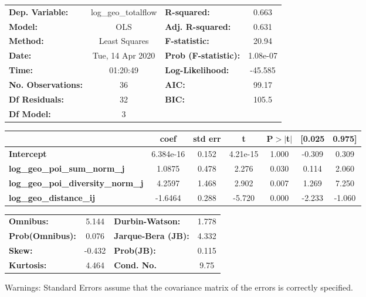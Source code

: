 \begin{center}
\begin{tabular}{lclc}
\toprule
\textbf{Dep. Variable:}                    & log\_geo\_totalflow & \textbf{  R-squared:         } &     0.663   \\
\textbf{Model:}                            &         OLS         & \textbf{  Adj. R-squared:    } &     0.631   \\
\textbf{Method:}                           &    Least Squares    & \textbf{  F-statistic:       } &     20.94   \\
\textbf{Date:}                             &   Tue, 14 Apr 2020  & \textbf{  Prob (F-statistic):} &  1.08e-07   \\
\textbf{Time:}                             &       01:20:49      & \textbf{  Log-Likelihood:    } &   -45.585   \\
\textbf{No. Observations:}                 &            36       & \textbf{  AIC:               } &     99.17   \\
\textbf{Df Residuals:}                     &            32       & \textbf{  BIC:               } &     105.5   \\
\textbf{Df Model:}                         &             3       & \textbf{                     } &             \\
\bottomrule
\end{tabular}
\begin{tabular}{lcccccc}
                                           & \textbf{coef} & \textbf{std err} & \textbf{t} & \textbf{P$> |$t$|$} & \textbf{[0.025} & \textbf{0.975]}  \\
\midrule
\textbf{Intercept}                         &    6.384e-16  &        0.152     &  4.21e-15  &         1.000        &       -0.309    &        0.309     \\
\textbf{log\_geo\_poi\_sum\_norm\_j}       &       1.0875  &        0.478     &     2.276  &         0.030        &        0.114    &        2.060     \\
\textbf{log\_geo\_poi\_diversity\_norm\_j} &       4.2597  &        1.468     &     2.902  &         0.007        &        1.269    &        7.250     \\
\textbf{log\_geo\_distance\_ij}            &      -1.6464  &        0.288     &    -5.720  &         0.000        &       -2.233    &       -1.060     \\
\bottomrule
\end{tabular}
\begin{tabular}{lclc}
\textbf{Omnibus:}       &  5.144 & \textbf{  Durbin-Watson:     } &    1.778  \\
\textbf{Prob(Omnibus):} &  0.076 & \textbf{  Jarque-Bera (JB):  } &    4.332  \\
\textbf{Skew:}          & -0.432 & \textbf{  Prob(JB):          } &    0.115  \\
\textbf{Kurtosis:}      &  4.464 & \textbf{  Cond. No.          } &     9.75  \\
\bottomrule
\end{tabular}
\end{center}

Warnings: \newline
 [1] Standard Errors assume that the covariance matrix of the errors is correctly specified.